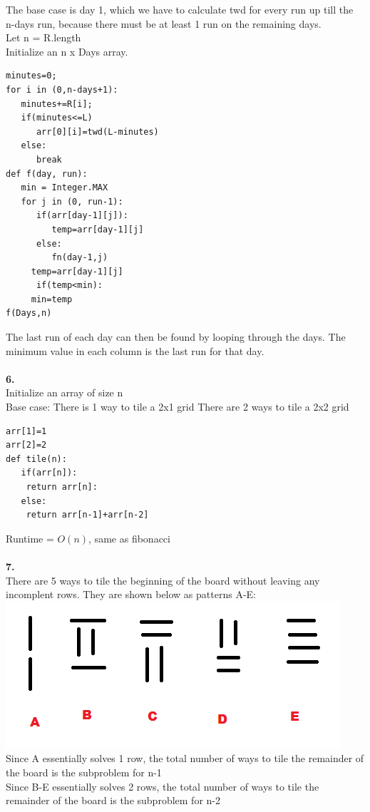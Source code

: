 \documentclass[a4paper,12pt]{article}
\begin{document}
The base case is day 1, which we have to calculate twd for every run up till the n-days run, because there must be at least 1 run on the remaining days. \\
Let n = R.length \\
Initialize an n x Days array. \\
\begin{lstlisting}
minutes=0;
for i in (0,n-days+1):
   minutes+=R[i];
   if(minutes<=L)
      arr[0][i]=twd(L-minutes)
   else:
      break
def f(day, run):
   min = Integer.MAX
   for j in (0, run-1):
      if(arr[day-1][j]):
         temp=arr[day-1][j]
      else:
         fn(day-1,j)
	 temp=arr[day-1][j]
      if(temp<min):
	 min=temp
f(Days,n)
\end{lstlisting}
The last run of each day can then be found by looping through the days. The minimum value in each column is the last run for that day. \\\\
\noindent \textbf{6.} \\
Initialize an array of size n \\
Base case: 
There is 1 way to tile a 2x1 grid
There are 2 ways to tile a 2x2 grid
\begin{lstlisting}
arr[1]=1
arr[2]=2
def tile(n):
   if(arr[n]):
	return arr[n]:
   else:
	return arr[n-1]+arr[n-2]
\end{lstlisting}
Runtime = $O(n)$, same as fibonacci \\\\
\noindent \textbf{7.} \\
There are 5 ways to tile the beginning of the board without leaving any incomplent rows. They are shown below as patterns A-E:\\
\includegraphics{simple}\\
Since A essentially solves 1 row, the total number of ways to tile the remainder of the board is the subproblem for n-1\\
Since B-E essentially solves 2 rows, the total number of ways to tile the remainder of the board is the subproblem for n-2\\
\end{document}
